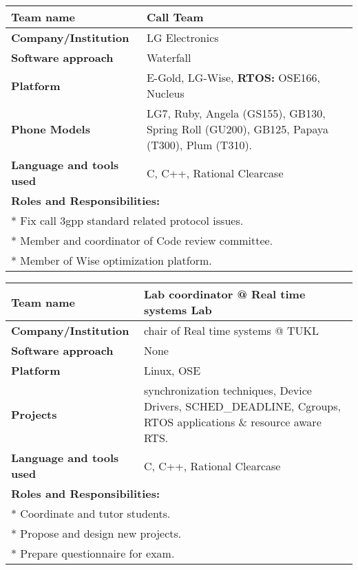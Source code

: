 \documentclass[letterpaper]{twentysecondcv} %
\begin{document}
  \vspace{4mm}
 
 \begin{tabular}{ |p{7cm}|p{13cm}| }
\hline
\rowcolor{sidecolor} 
\textbf{{\large Team name}} & \textbf{Call Team}\\[2ex]
 \hline
\rowcolor{sidecolor}
\textbf{{\large Company/Institution}} & LG Electronics\\[2ex]
 \hline
 \textbf{{\large Software approach}} & Waterfall \\[2ex]
 \hline
 \textbf{{\large Platform}} & E-Gold, LG-Wise, \textbf{RTOS:} OSE166, Nucleus\\[2ex]
 \hline
 \textbf{\large Phone Models} & LG7, Ruby, Angela (GS155), GB130, Spring Roll (GU200), GB125, Papaya (T300), Plum (T310).\\[2ex]
 
 \hline
  \textbf{{\large Language and tools used}} & C, C++, Rational Clearcase\\[2ex]
 \hline
 
 \multicolumn{2}{l}{
 \textbf{\large Roles and Responsibilities:}} \\[2ex]
 \multicolumn{2}{l}{
 	* Fix call 3gpp standard related protocol issues.}\\
 \multicolumn{2}{l}{
 	* Member and coordinator of Code review committee.}\\
 \multicolumn{2}{l}{
 	* Member of Wise optimization platform.
 }\\
 \hline
 \hline
 \end{tabular}
 
\vspace{3mm}
 
\begin{tabular}{ |p{7cm}|p{13cm}| }
\hline
\rowcolor{sidecolor} 
\textbf{{\large Team name}} & \textbf{ Lab coordinator @ Real time systems Lab}\\[2ex]
 \hline
\rowcolor{sidecolor}
\textbf{{\large Company/Institution}} & chair of Real time systems @ TUKL\\[2ex]
 \hline
 \textbf{{\large Software approach}} & None \\[2ex]
 \hline
 \textbf{{\large Platform}} & Linux, OSE  \\[2ex]
 \hline
 \textbf{\large Projects} & synchronization techniques, Device Drivers, SCHED\_DEADLINE, Cgroups, \newline RTOS  applications \& resource aware RTS.\\[2ex]
 
 \hline
  \textbf{{\large Language and tools used}} & C, C++, Rational Clearcase\\[2ex]
 \hline
 
 \multicolumn{2}{l}{
 \textbf{\large Roles and Responsibilities:}} \\[2ex]
 \multicolumn{2}{l}{
 	* Coordinate and tutor students.}\\
 \multicolumn{2}{l}{
 	* Propose and design new projects.}\\
 \multicolumn{2}{l}{
 	* Prepare questionnaire for exam.
 }\\
 \hline
 \hline
 \end{tabular}
\vspace{1mm}
\end{document}
